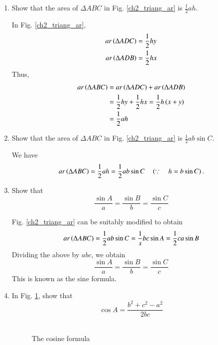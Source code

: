 \begin{enumerate}[label=\arabic*.,ref=\thesubsection.\theenumi]
\item
	Show that the area of $\Delta ABC$ in Fig. 	\ref{ch2_triang_ar}	is $\frac{1}{2}ah$.


\solution In Fig. \ref{ch2_triang_ar},
\begin{align}
ar\left(\Delta ADC\right) &= \frac{1}{2}hy \\
ar\left(\Delta ADB\right) &= \frac{1}{2}hx 
\end{align}
Thus,
\begin{align}
ar\left(\Delta ABC\right) &= ar\left(\Delta ADC\right) + ar\left(\Delta ADB\right) \\
&= \frac{1}{2}hy + \frac{1}{2}hx = \frac{1}{2}h\left(x+y\right) \\
&= \frac{1}{2}ah
\end{align}
\item
\label{prob:tri_area_sin}
	Show that the area of $\Delta ABC$ in Fig. 	\ref{ch2_triang_ar}	is $\frac{1}{2}ab \sin C$.

\solution We have
%
\begin{equation}
ar\left(\Delta ABC\right) = \frac{1}{2}ah = \frac{1}{2}ab\sin C \quad \left(\because \quad h = b \sin C\right).
\end{equation}
%
\item
	Show that 
	\begin{equation}
	\frac{\sin A}{a} = \frac{\sin B}{b} = \frac{\sin C}{c}
	\end{equation}

\solution Fig. \ref{ch2_triang_ar} can be suitably modified to obtain 
\begin{equation}
ar\left(\Delta ABC\right) = \frac{1}{2}ab\sin C = \frac{1}{s}bc\sin A = \frac{1}{2}ca\sin B
\end{equation}
Dividing the above by $abc$, we obtain
	\begin{equation}
\label{eq:tri_sin_form}
	\frac{\sin A}{a} = \frac{\sin B}{b} = \frac{\sin C}{c}
	\end{equation}
This is known as the sine formula.	
%
\item
In Fig. \ref{ch2_cosine_formula}, show that
%
\begin{equation}
\label{eq:tri_cos_form}
\cos A = \frac{b^2+c^2-a^2}{2bc}
\end{equation}
%
\

\begin{figure}[!ht]
	\begin{center}
		
		\resizebox{\columnwidth}{!}{}
	\end{center}
	\caption{The cosine formula}
	\label{ch2_cosine_formula}	
\end{figure}


\end{enumerate}
